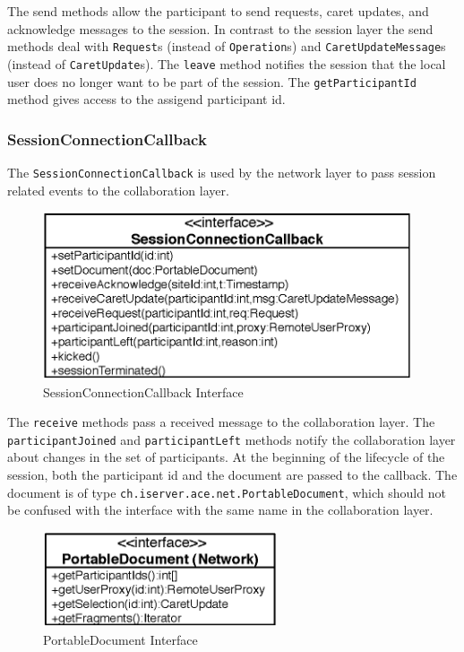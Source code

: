 The send methods allow the participant to send requests, caret updates,
and acknowledge messages to the session. In contrast to the session
layer the send methods deal with \texttt{Request}s (instead of
\texttt{Operation}s) and \texttt{Caret\-Update\-Message}s (instead of
\texttt{Caret\-Update}s). The
\texttt{leave} method notifies the session that the local user does
no longer want to be part of the session. The \texttt{get\-Participant\-Id}
method gives access to the assigend participant id.


\subsubsection{SessionConnectionCallback}
The \texttt{Session\-Connection\-Callback} is used by the network layer
to pass session related events to the collaboration layer.

\begin{figure}[H]
 \centering
 \includegraphics[width=10.87cm,height=4.94cm]{../images/finalreport/architecture_sessionconnectioncallback_uml.eps}
 \caption{SessionConnectionCallback Interface}
\end{figure}

The \texttt{receive} methods pass a received message to the collaboration
layer. The \texttt{participant\-Joined} and \texttt{participant\-Left} methods
notify the collaboration layer about changes in the set of participants.
At the beginning of the lifecycle of the session, both the participant
id and the document are passed to the callback. The document is of
type \texttt{ch.\-iserver.\-ace.\-net.\-PortableDocument}, which should not
be confused with the interface with the same name in the collaboration
layer.

\begin{figure}[H]
 \centering
 \includegraphics[width=6.91cm,height=2.82cm]{../images/finalreport/architecture_portabledocumentnet_uml.eps}
 \caption{PortableDocument Interface}
\end{figure}

